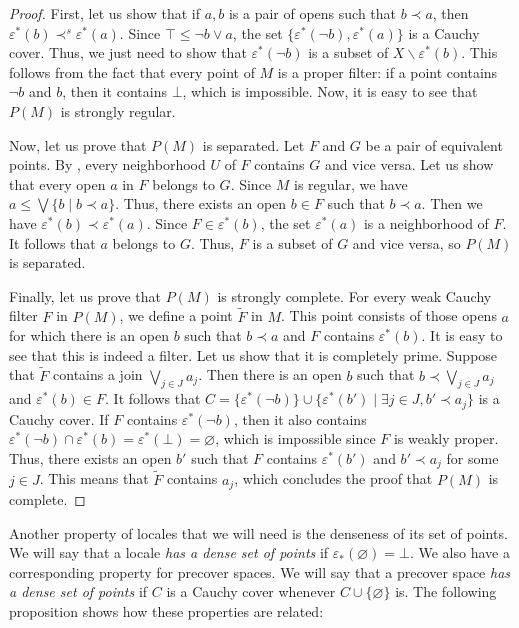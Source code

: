 \documentclass[reqno]{amsart}
\theoremstyle{definition}
\theoremstyle{remark}
\numberwithin{figure}{section}
\newcommand{\rb}{\prec}
\begin{document}
\begin{proof}
First, let us show that if $a,b$ is a pair of opens such that $b \rb a$, then $\varepsilon^*(b) \rb^s \varepsilon^*(a)$.
Since $\top \leq \neg b \vee a$, the set $\{ \varepsilon^*(\neg b), \varepsilon^*(a) \}$ is a Cauchy cover.
Thus, we just need to show that $\varepsilon^*(\neg b)$ is a subset of $X \backslash \varepsilon^*(b)$.
This follows from the fact that every point of $M$ is a proper filter: if a point contains $\neg b$ and $b$, then it contains $\bot$, which is impossible.
Now, it is easy to see that $P(M)$ is strongly regular.

Now, let us prove that $P(M)$ is separated.
Let $F$ and $G$ be a pair of equivalent points.
By , every neighborhood $U$ of $F$ contains $G$ and vice versa.
Let us show that every open $a$ in $F$ belongs to $G$.
Since $M$ is regular, we have $a \leq \bigvee \{ b \mid b \rb a \}$.
Thus, there exists an open $b \in F$ such that $b \rb a$.
Then we have $\varepsilon^*(b) \rb \varepsilon^*(a)$.
Since $F \in \varepsilon^*(b)$, the set $\varepsilon^*(a)$ is a neighborhood of $F$.
It follows that $a$ belongs to $G$.
Thus, $F$ is a subset of $G$ and vice versa, so $P(M)$ is separated.

Finally, let us prove that $P(M)$ is strongly complete.
For every weak Cauchy filter $F$ in $P(M)$, we define a point $\widetilde{F}$ in $M$.
This point consists of those opens $a$ for which there is an open $b$ such that $b \rb a$ and $F$ contains $\varepsilon^*(b)$.
It is easy to see that this is indeed a filter.
Let us show that it is completely prime.
Suppose that $\widetilde{F}$ contains a join $\bigvee_{j \in J} a_j$.
Then there is an open $b$ such that $b \rb \bigvee_{j \in J} a_j$ and $\varepsilon^*(b) \in F$.
It follows that $C = \{ \varepsilon^*(\neg b) \} \cup \{ \varepsilon^*(b') \mid \exists j \in J, b' \rb a_j \}$ is a Cauchy cover.
If $F$ contains $\varepsilon^*(\neg b)$, then it also contains $\varepsilon^*(\neg b) \cap \varepsilon^*(b) = \varepsilon^*(\bot) = \varnothing$, which is impossible since $F$ is weakly proper.
Thus, there exists an open $b'$ such that $F$ contains $\varepsilon^*(b')$ and $b' \rb a_j$ for some $j \in J$.
This means that $\widetilde{F}$ contains $a_j$, which concludes the proof that $P(M)$ is complete.
\end{proof}

Another property of locales that we will need is the denseness of its set of points.
We will say that a locale \emph{has a dense set of points} if $\varepsilon_*(\varnothing) = \bot$.
We also have a corresponding property for precover spaces.
We will say that a precover space \emph{has a dense set of points} if $C$ is a Cauchy cover whenever $C \cup \{ \varnothing \}$ is.
The following proposition shows how these properties are related:
\end{document}
